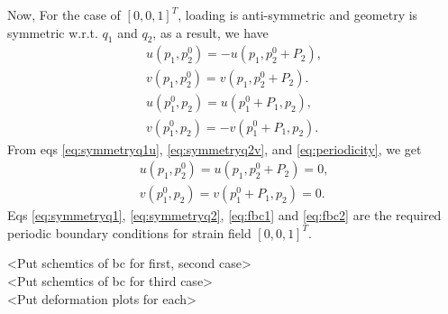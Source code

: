\documentclass[10pt]{article}
\begin{document}
\par
Now, For the case of $[0, 0, 1]^T$, loading is anti-symmetric and geometry is symmetric w.r.t. $q_1$ and $q_2$, as a result, we have
\begin{eqnarray}
\label{eq:symmetryq1u}
u(p_1, p_2^0) = -u(p_1, p_2^0+P_2),\\
\label{eq:symmetryq1}
v(p_1, p_2^0) = v(p_1, p_2^0+P_2).\\
\label{eq:symmetryq2}
u(p_1^0, p_2) = u(p_1^0+P_1, p_2),\\
\label{eq:symmetryq2v}
v(p_1^0, p_2) = -v(p_1^0+P_1, p_2).
\end{eqnarray}
From eqs \eqref{eq:symmetryq1u}, \eqref{eq:symmetryq2v}, and \eqref{eq:periodicity}, we get
\begin{eqnarray}
\label{eq:fbc2}
u(p_1, p_2^0) = u(p_1, p_2^0+P_2) = 0,\\
\label{eq:fbc1}
v(p_1^0, p_2) = v(p_1^0+P_1, p_2) = 0.
\end{eqnarray}
Eqs \eqref{eq:symmetryq1}, \eqref{eq:symmetryq2}, \eqref{eq:fbc1} and 
\eqref{eq:fbc2} are the required periodic boundary conditions for strain field $[0, 0, 1]^T$.\par
<Put schemtics of bc for first, second case>\\
<Put schemtics of bc for third case>\\
<Put deformation plots for each>\\
\end{document}
